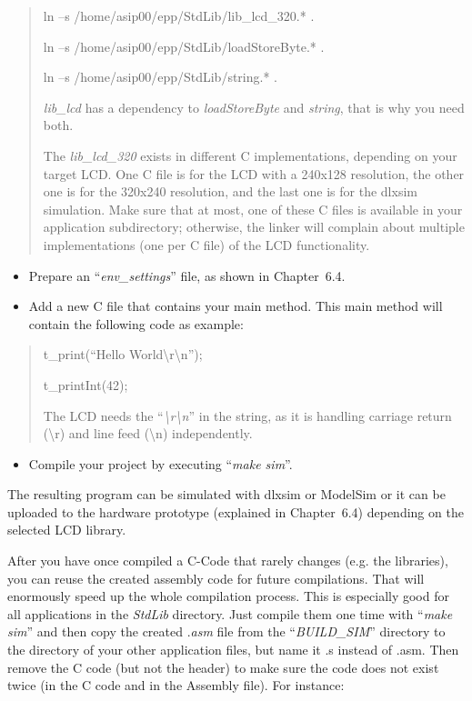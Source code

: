 \documentclass[
]{article}
\begin{document}
\begin{quote}
ln --s /home/asip00/epp/StdLib/lib\_lcd\_320.* .

ln --s /home/asip00/epp/StdLib/loadStoreByte.* .

ln --s /home/asip00/epp/StdLib/string.* .

\emph{lib\_lcd} has a dependency to \emph{loadStoreByte} and
\emph{string}, that is why you need both.

The \emph{lib\_lcd\_320} exists in different C implementations,
depending on your target LCD. One C file is for the LCD with a 240x128
resolution, the other one is for the 320x240 resolution, and the last
one is for the dlxsim simulation. Make sure that at most, one of these C
files is available in your application subdirectory; otherwise, the
linker will complain about multiple implementations (one per C file) of
the LCD functionality.
\end{quote}

\begin{itemize}
\item
  Prepare an ``\emph{env\_settings}'' file, as shown in Chapter~6.4.
\item
  Add a new C file that contains your main method. This main method will
  contain the following code as example:
\end{itemize}

\begin{quote}
t\_print(``Hello World\textbackslash r\textbackslash n'');

t\_printInt(42);

The LCD needs the ``\emph{\textbackslash r\textbackslash n}'' in the
string, as it is handling carriage return (\textbackslash r) and line
feed (\textbackslash n) independently.
\end{quote}

\begin{itemize}
\item
  Compile your project by executing ``\emph{make sim}''.
\end{itemize}

The resulting program can be simulated with dlxsim or ModelSim or it can
be uploaded to the hardware prototype (explained in Chapter~6.4)
depending on the selected LCD library.

After you have once compiled a C-Code that rarely changes (e.g. the
libraries), you can reuse the created assembly code for future
compilations. That will enormously speed up the whole compilation
process. This is especially good for all applications in the
\emph{StdLib} directory. Just compile them one time with ``\emph{make
sim}'' and then copy the created .\emph{asm} file from the
``\emph{BUILD\_SIM}'' directory to the directory of your other
application files, but name it .s instead of .asm. Then remove the C
code (but not the header) to make sure the code does not exist twice (in
the C code and in the Assembly file). For instance:
\end{document}
